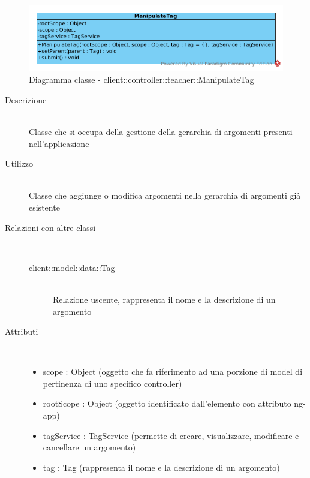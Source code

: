 \begin{center}
			\begin{figure}[H]
				\centering \includegraphics[scale=4, max width=\textwidth, max height=\myheight]{../img/diagrammiClassi/client/controller/teacher/ManipulateTag.png}
				\caption{Diagramma classe - client::controller::teacher::ManipulateTag}
			\end{figure}
		\end{center}\begin{description}
\item[Descrizione] \hfill \\
 Classe che si occupa della gestione della gerarchia di argomenti presenti nell'applicazione
\item[Utilizzo] \hfill \\
 Classe che aggiunge o modifica argomenti nella gerarchia di argomenti già esistente
\item[Relazioni con altre classi] \hfill \\
 \vspace{-7mm}
\begin{description}
\item[\hyperlink{client::model::data::Tag}{client::model::data::Tag}] \hfill \\
 Relazione uscente, rappresenta il nome e la descrizione di un argomento
\end{description}

\item[Attributi] \hfill \\
 \vspace{-7mm}
\begin{itemize}
\item scope : Object (oggetto che fa riferimento ad una porzione di model di pertinenza di uno specifico controller)
\item rootScope : Object (oggetto identificato dall’elemento con attributo ng-app)
\item tagService : TagService (permette di creare, visualizzare, modificare e cancellare un argomento)
\item tag  : Tag  (rappresenta il nome e la descrizione di un argomento)
\end{itemize}


\end{description}

